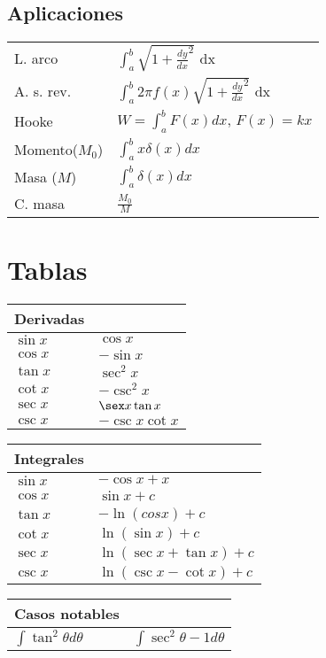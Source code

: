 \documentclass[11pt]{article}
\begin{document}
\begin{multicols}{3}
\subsection{Aplicaciones}
\label{sec-2-12}

\begin{center}
\begin{tabular}{ll}
L. arco & $\int_{a}^{b} \sqrt{1 + \frac{dy}{dx}^2}$ dx\\
A. s. rev. & $\int_{a}^{b} 2\pi f(x) \sqrt{1 + \frac{dy}{dx}^2}$ dx\\
Hooke & $W=\int_{a}^{b} F(x)dx$, $F(x)=kx$\\
Momento($M_{0}$) & $\int_{a}^{b}x\delta(x)dx$\\
Masa ($M$) & $\int_{a}^{b}\delta(x)dx$\\
C. masa & $\frac{M_{0}}{M}$\\
\end{tabular}
\end{center}



\section{Tablas}
\label{sec-2-13}

\begin{center}
\begin{tabular}{ll}
Derivadas & \\
\hline
$\sin x$ & $\cos x$\\
$\cos x$ & $-\sin x$\\
$\tan x$ & $\sec^2 x$\\
$\cot x$ & $-\csc^2 x$\\
$\sec x$ & $\sex x \tan x$\\
$\csc x$ & $-\csc x \cot x$\\
\end{tabular}
\end{center}

\begin{center}
\begin{tabular}{ll}
Integrales & \\
\hline
$\sin x$ & $- \cos x + x$\\
$\cos x$ & $\sin x + c$\\
$\tan x$ & $-\ln(cos x) + c$\\
$\cot x$ & $\ln(\sin x) + c$\\
$\sec x$ & $\ln(\sec x + \tan x) + c$\\
$\csc x$ & $\ln(\csc x - \cot x) + c$\\
\end{tabular}
\end{center}


\begin{center}
\begin{tabular}{ll}
Casos notables & \\
\hline
$\int \tan^2 \theta d\theta$ & $\int \sec^2 \theta - 1 d\theta$\\
\end{tabular}
\end{center}
\end{multicols}
\end{document}
